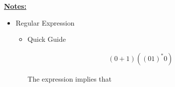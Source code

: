 \documentclass[12pt]{article}
\begin{document}
\begin{enumerate}[a.]







    \bigskip

    \underline{\textbf{Notes:}}

    \bigskip

    \begin{itemize}
        \item Regular Expression
        \begin{itemize}
            \item Quick Guide

            \begin{align}
                (0+1)((01)^*0)
            \end{align}

            \bigskip

            The expression implies that


\end{itemize}
\end{itemize}
\end{enumerate}
\end{document}
